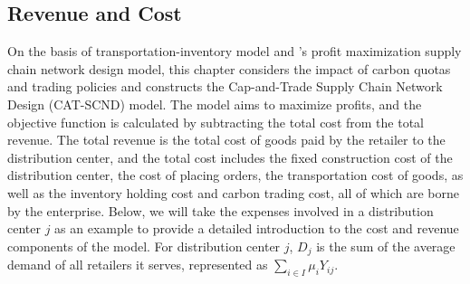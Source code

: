 \documentclass[]{article}
\theoremstyle{plain}%
\theoremstyle{definition}
\theoremstyle{remark}
\theoremstyle{plain}%
\begin{document}
    \subsection{Revenue and Cost}
    On the basis of \cite{shen2003joint}  transportation-inventory model and \cite{shen2006profit}'s profit maximization supply chain network design model, this chapter considers the impact of carbon quotas and trading policies and constructs the Cap-and-Trade Supply Chain Network Design (CAT-SCND) model. The model aims to maximize profits, and the objective function is calculated by subtracting the total cost from the total revenue. The total revenue is the total cost of goods paid by the retailer to the distribution center, and the total cost includes the fixed construction cost of the distribution center, the cost of placing orders, the transportation cost of goods, as well as the inventory holding cost and carbon trading cost, all of which are borne by the enterprise. Below, we will take the expenses involved in a distribution center $j$ as an example to provide a detailed introduction to the cost and revenue components of the model. For distribution center $j$, $D_j$ is the sum of the average demand of all retailers it serves, represented as $\sum_{i\in I}\mu_iY_{ij}$.
    
\end{document}
